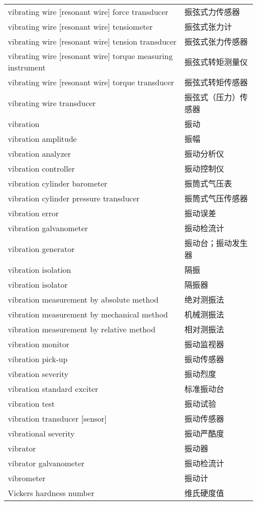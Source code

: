 \documentclass[
]{article}
\begin{document}
\begin{longtable}[]{@{}ll@{}}
vibrating wire {[}resonant wire{]} force transducer & 振弦式力传感器 \\
vibrating wire {[}resonant wire{]} tensiometer & 振弦式张力计 \\
vibrating wire {[}resonant wire{]} tension transducer &
振弦式张力传感器 \\
vibrating wire {[}resonant wire{]} torque measuring instrument &
振弦式转矩测量仪 \\
vibrating wire {[}resonant wire{]} torque transducer &
振弦式转矩传感器 \\
vibrating wire transducer & 振弦式（压力）传感器 \\
vibration & 振动 \\
vibration amplitude & 振幅 \\
vibration analyzer & 振动分析仪 \\
vibration controller & 振动控制仪 \\
vibration cylinder barometer & 振筒式气压表 \\
vibration cylinder pressure transducer & 振筒式气压传感器 \\
vibration error & 振动误差 \\
vibration galvanometer & 振动检流计 \\
vibration generator & 振动台；振动发生器 \\
vibration isolation & 隔振 \\
vibration isolator & 隔振器 \\
vibration measurement by absolute method & 绝对测振法 \\
vibration measurement by mechanical method & 机械测振法 \\
vibration measurement by relative method & 相对测振法 \\
vibration monitor & 振动监视器 \\
vibration pick-up & 振动传感器 \\
vibration severity & 振动烈度 \\
vibration standard exciter & 标准振动台 \\
vibration test & 振动试验 \\
vibration transducer {[}sensor{]} & 振动传感器 \\
vibrational severity & 振动严酷度 \\
vibrator & 振动器 \\
vibrator galvanometer & 振动检流计 \\
vibrometer & 振动计 \\
Vickers hardness number & 维氏硬度值 \\

\end{longtable}
\end{document}

